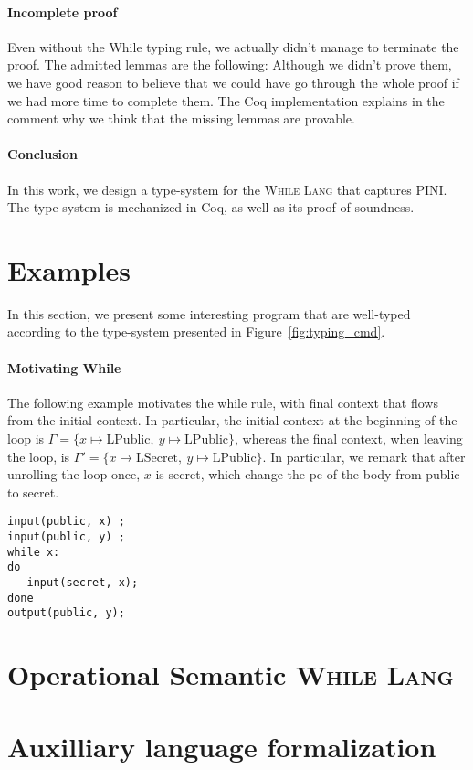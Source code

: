 \documentclass[10pt]{article}
\newcommand{\ctx}{\Gamma}
\newcommand{\public}{\mathrm{LPublic}}
\newcommand{\secret}{\mathrm{LSecret}}
\newcommand{\whilelang}{\textsc{While Lang} }
\begin{document}
\paragraph{Incomplete proof}
Even without the While typing rule, we actually didn't manage to terminate the proof.
The admitted lemmas are the following:
Although we didn't prove them, we have good reason to believe that we could have go through the
whole proof if we had more time to complete them. The Coq implementation explains in the comment why
we think that the missing lemmas are provable.

\paragraph{Conclusion}
In this work, we design a type-system for the \whilelang that captures PINI.
The type-system is mechanized in Coq, as well as its proof of soundness.

\appendix

\section{Examples}%
\label{sec:examples}

In this section, we present some interesting program that are well-typed according to the
type-system presented in Figure~\ref{fig:typing_cmd}.

\paragraph{Motivating While}
The following example motivates the while rule, with final context that flows from the initial
context. In particular, the initial context at the beginning of the loop is
$\ctx = \{ x \mapsto \public,\ y \mapsto \public \}$, whereas the final context, when leaving the
loop, is $\ctx' = \{ x \mapsto \secret,\ y \mapsto \public \}$. In particular, we remark that after
unrolling the loop once, $x$ is secret, which change the pc of the body from public to secret.
\begin{verbatim}
input(public, x) ;
input(public, y) ;
while x:
do
   input(secret, x);
done
output(public, y);
\end{verbatim}

\section{Operational Semantic \whilelang}%


\section{Auxilliary language formalization}%

% 
% 
\end{document}
